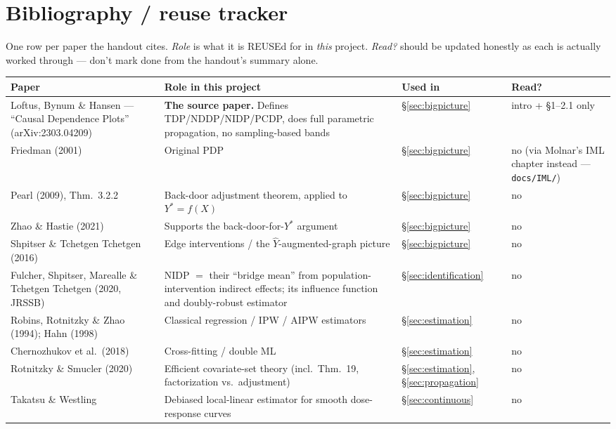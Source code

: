 \section{Bibliography / reuse tracker}
\label{sec:papers}

One row per paper the handout cites. \emph{Role} is what it is REUSEd for in
\emph{this} project. \emph{Read?} should be updated honestly as each is
actually worked through --- don't mark done from the handout's summary
alone.

\begin{longtable}{@{}p{3.6cm}p{5.6cm}p{2.1cm}p{1.4cm}@{}}
\toprule
\textbf{Paper} & \textbf{Role in this project} & \textbf{Used in} &
\textbf{Read?} \\
\midrule
\endhead
Loftus, Bynum \& Hansen --- ``Causal Dependence Plots'' (arXiv:2303.04209) &
  \textbf{The source paper.} Defines TDP/NDDP/NIDP/PCDP, does full
  parametric propagation, no sampling-based bands & \S\ref{sec:bigpicture} &
  intro + \S1--2.1 only \\
Friedman (2001) & Original PDP & \S\ref{sec:bigpicture} & no (via Molnar's
  IML chapter instead --- \texttt{docs/IML/}) \\
Pearl (2009), Thm.\ 3.2.2 & Back-door adjustment theorem, applied to
  $Y^*=f(X)$ & \S\ref{sec:bigpicture} & no \\
Zhao \& Hastie (2021) & Supports the back-door-for-$Y^*$ argument &
  \S\ref{sec:bigpicture} & no \\
Shpitser \& Tchetgen Tchetgen (2016) & Edge interventions / the
  $\hat Y$-augmented-graph picture & \S\ref{sec:bigpicture} & no \\
Fulcher, Shpitser, Marealle \& Tchetgen Tchetgen (2020, JRSSB) & NIDP $=$
  their ``bridge mean'' from population-intervention indirect effects; its
  influence function and doubly-robust estimator &
  \S\ref{sec:identification} & no \\
Robins, Rotnitzky \& Zhao (1994); Hahn (1998) & Classical regression / IPW /
  AIPW estimators & \S\ref{sec:estimation} & no \\
Chernozhukov et al.\ (2018) & Cross-fitting / double ML &
  \S\ref{sec:estimation} & no \\
Rotnitzky \& Smucler (2020) & Efficient covariate-set theory (incl.\ Thm.\
  19, factorization vs.\ adjustment) & \S\ref{sec:estimation},
  \S\ref{sec:propagation} & no \\
Takatsu \& Westling & Debiased local-linear estimator for smooth
  dose-response curves & \S\ref{sec:continuous} & no \\

\end{longtable}
